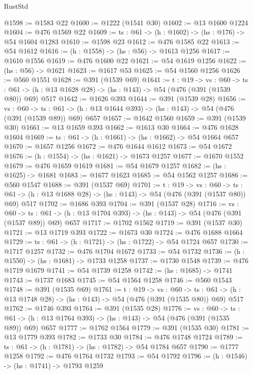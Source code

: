 \begin{lexlean}{RustStd}
\begin{coremodule}
@1598 := @1583 @22
@1600 := @1222 (@1541 @30)
@1602 := @13 @1600 @1224
@1604 := @476 @1569 @22
@1609 := {ts : @61} -> (h : @1602) -> (hs : @176) -> @54 @1604 @1283
@1610 := @1598 @23
@1612 := @476 @1585 @22
@1613 := @54 @1612
@1616 := (h : @1558) -> (hs : @56) -> @1613 @1256
@1617 := @1610 @1556
@1619 := @476 @1600 @22
@1621 := @54 @1619 @1256
@1622 := (hs : @56) -> @1621
@1623 := @1617 @53
@1625 := @54 @1560 @1256
@1626 := @560 @1551
@1628 := @391 (@1539 @69)
@1641 := {t : @19} ->
  {vs : @60} ->
  {ts : @61} -> (h : @13 @1628 @28) -> (hs : @143) -> @54 (@476 (@391 (@1539 @80)) @69) @517
@1642 := @1626 @393
@1644 := @391 (@1539 @28)
@1656 := {vs : @60} ->
  {ts : @61} -> (h : @13 @1644 @393) -> (hs : @143) -> @54 (@476 (@391 (@1539 @89)) @69) @657
@1657 := @1642 @1560
@1659 := @391 (@1539 @30)
@1661 := @13 @1659 @393
@1662 := @1613 @30
@1664 := @476 @1628 @1604
@1669 := {ts : @61} -> (h : @1661) -> (hs : @1662) -> @54 @1664 @657
@1670 := @1657 @1256
@1672 := @476 @1644 @1612
@1673 := @54 @1672
@1676 := (h : @1554) -> (hs : @1621) -> @1673 @1257
@1677 := @1670 @1552
@1679 := @476 @1659 @1619
@1681 := @54 @1679 @1257
@1682 := (hs : @1625) -> @1681
@1683 := @1677 @1623
@1685 := @54 @1562 @1257
@1686 := @560 @1547
@1688 := @391 (@1537 @69)
@1701 := {t : @19} ->
  {vs : @60} ->
  {ts : @61} -> (h : @13 @1688 @28) -> (hs : @143) -> @54 (@476 (@391 (@1537 @80)) @69) @517
@1702 := @1686 @393
@1704 := @391 (@1537 @28)
@1716 := {vs : @60} ->
  {ts : @61} -> (h : @13 @1704 @393) -> (hs : @143) -> @54 (@476 (@391 (@1537 @89)) @69) @657
@1717 := @1702 @1562
@1719 := @391 (@1537 @30)
@1721 := @13 @1719 @393
@1722 := @1673 @30
@1724 := @476 @1688 @1664
@1729 := {ts : @61} -> (h : @1721) -> (hs : @1722) -> @54 @1724 @657
@1730 := @1717 @1257
@1732 := @476 @1704 @1672
@1733 := @54 @1732
@1736 := (h : @1550) -> (hs : @1681) -> @1733 @1258
@1737 := @1730 @1548
@1739 := @476 @1719 @1679
@1741 := @54 @1739 @1258
@1742 := (hs : @1685) -> @1741
@1743 := @1737 @1683
@1745 := @54 @1564 @1258
@1746 := @560 @1543
@1748 := @391 (@1535 @69)
@1761 := {t : @19} ->
  {vs : @60} ->
  {ts : @61} -> (h : @13 @1748 @28) -> (hs : @143) -> @54 (@476 (@391 (@1535 @80)) @69) @517
@1762 := @1746 @393
@1764 := @391 (@1535 @28)
@1776 := {vs : @60} ->
  {ts : @61} -> (h : @13 @1764 @393) -> (hs : @143) -> @54 (@476 (@391 (@1535 @89)) @69) @657
@1777 := @1762 @1564
@1779 := @391 (@1535 @30)
@1781 := @13 @1779 @393
@1782 := @1733 @30
@1784 := @476 @1748 @1724
@1789 := {ts : @61} -> (h : @1781) -> (hs : @1782) -> @54 @1784 @657
@1790 := @1777 @1258
@1792 := @476 @1764 @1732
@1793 := @54 @1792
@1796 := (h : @1546) -> (hs : @1741) -> @1793 @1259

\end{coremodule}
\end{lexlean}
